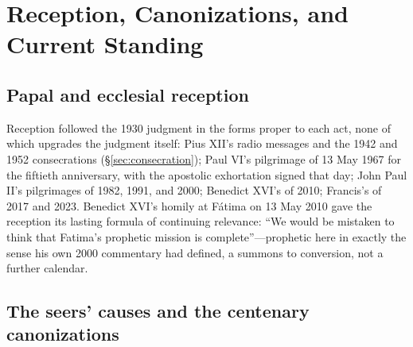 \section{Reception, Canonizations, and Current Standing}\label{sec:standing}

\subsection{Papal and ecclesial reception}

Reception followed the 1930 judgment in the forms proper to each act,
none of which upgrades the judgment itself: Pius XII's radio messages
and the 1942 and 1952 consecrations (\S\ref{sec:consecration}); Paul VI's pilgrimage of
13 May 1967 for the fiftieth anniversary, with the apostolic
exhortation  signed that day; John Paul II's
pilgrimages of 1982, 1991, and 2000; Benedict XVI's of 2010; Francis's
of 2017 and 2023. Benedict XVI's homily at F\'atima on 13 May 2010
gave the reception its lasting formula of continuing relevance: ``We
would be mistaken to think that Fatima's prophetic mission is
complete''---prophetic here in exactly the sense his own 2000
commentary had defined, a summons to conversion, not a further
calendar.

\subsection{The seers' causes and the centenary canonizations}

